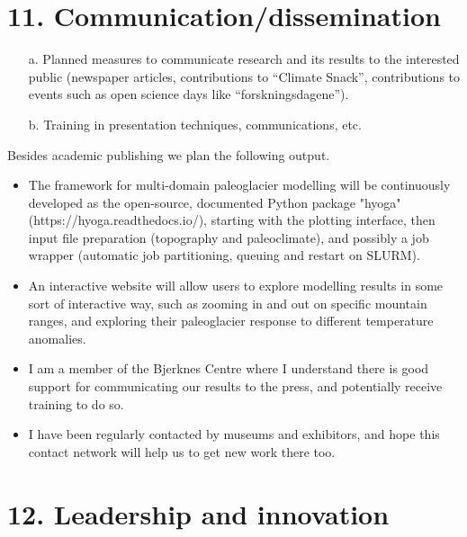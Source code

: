 \documentclass{article}
\newcommand{\guideline}[1]{{\color{color2}\itshape{#1}}}
\begin{document}
\section{11. Communication/dissemination}

    \guideline{
        \begin{itemize}
          \item[a.] Planned measures to communicate research and its results to
            the interested public (newspaper articles, contributions to
            ``Climate Snack'', contributions to events such as open science
            days like ``forskningsdagene'').
          \item[b.] Training in presentation techniques, communications, etc.
        \end{itemize}}

    Besides academic publishing we plan the following output.

    \begin{itemize}
      \item The framework for multi-domain paleoglacier modelling will be
        continuously developed as the open-source, documented Python package
        "hyoga" (https://hyoga.readthedocs.io/), starting with the plotting
        interface, then input file preparation (topography and paleoclimate),
        and possibly a job wrapper (automatic job partitioning, queuing and
        restart on SLURM).
      \item An interactive website will allow users to explore modelling
        results in some sort of interactive way, such as zooming in and out on
        specific mountain ranges, and exploring their paleoglacier response to
        different temperature anomalies.
      \item I am a member of the Bjerknes Centre where I understand there is
        good support for communicating our results to the press, and
        potentially receive training to do so.
      \item I have been regularly contacted by museums and exhibitors, and hope
        this contact network will help us to get new work there too.
    \end{itemize}


\section{12. Leadership and innovation}
\end{document}

